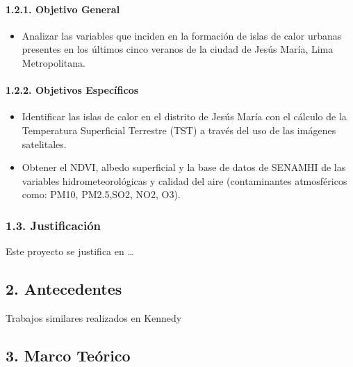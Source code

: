 \documentclass[
]{article}
\providecommand{\tightlist}{%
  \setlength{\itemsep}{0pt}\setlength{\parskip}{0pt}}
\begin{document}
\hypertarget{objetivo-general}{%
\paragraph{1.2.1. Objetivo General}\label{objetivo-general}}

\begin{itemize}
\tightlist
\item
  Analizar las variables que inciden en la formación de islas de calor
  urbanas presentes en los últimos cinco veranos de la ciudad de Jesús
  María, Lima Metropolitana.
\end{itemize}

\hypertarget{objetivos-especuxedficos}{%
\paragraph{1.2.2. Objetivos
Específicos}\label{objetivos-especuxedficos}}

\begin{itemize}
\item
  Identificar las islas de calor en el distrito de Jesús María con el
  cálculo de la Temperatura Superficial Terrestre (TST) a través del uso
  de las imágenes satelitales.
\item
  Obtener el NDVI, albedo superficial y la base de datos de SENAMHI de
  las variables hidrometeorológicas y calidad del aire (contaminantes
  atmosféricos como: PM10, PM2.5,SO2, NO2, O3).
\end{itemize}

\hypertarget{justificaciuxf3n}{%
\subsubsection{1.3. Justificación}\label{justificaciuxf3n}}

Este proyecto se justifica en \ldots{}

\hypertarget{antecedentes}{%
\subsection{2. Antecedentes}\label{antecedentes}}

Trabajos similares realizados en Kennedy

\hypertarget{marco-teuxf3rico}{%
\subsection{3. Marco Teórico}\label{marco-teuxf3rico}}
\end{document}
